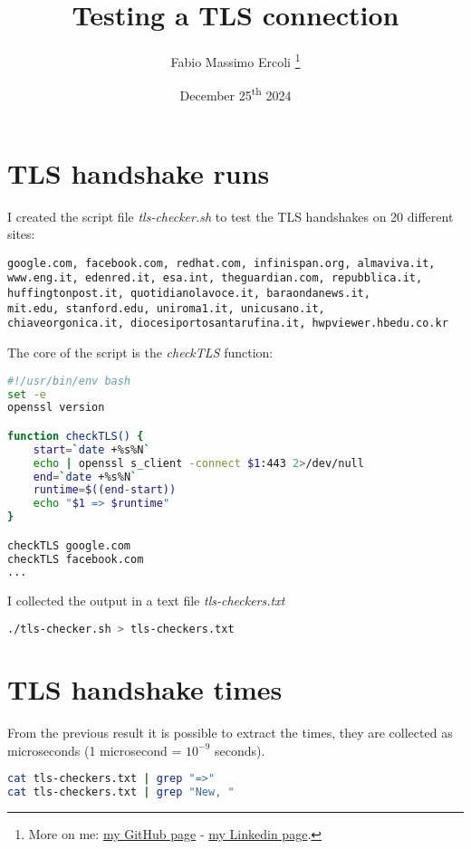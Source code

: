 \documentclass{article}
\title{Testing a TLS connection}
\author{Fabio Massimo Ercoli
	\footnote{
		More on me:
		\href{https://github.com/fax4ever}{my GitHub page} -
		\href{https://www.linkedin.com/in/fabioercoli}{my Linkedin page}.
}}
\date{December 25\textsuperscript{th} 2024}
\begin{document}
\maketitle
\thispagestyle{empty}
	
\section{TLS handshake runs}

I created the script file \emph{tls-checker.sh} to test the TLS handshakes
on 20 different sites:

\begin{verbatim}
google.com, facebook.com, redhat.com, infinispan.org, almaviva.it, 
www.eng.it, edenred.it, esa.int, theguardian.com, repubblica.it, 
huffingtonpost.it, quotidianolavoce.it, baraondanews.it, 
mit.edu, stanford.edu, uniroma1.it, unicusano.it, 
chiaveorgonica.it, diocesiportosantarufina.it, hwpviewer.hbedu.co.kr
\end{verbatim}

\noindent The core of the script is the \emph{checkTLS} function:

\begin{lstlisting}[language=bash]
#!/usr/bin/env bash
set -e
openssl version

function checkTLS() {
	start=`date +%s%N`
	echo | openssl s_client -connect $1:443 2>/dev/null
	end=`date +%s%N`
	runtime=$((end-start))
	echo "$1 => $runtime"
}

checkTLS google.com
checkTLS facebook.com
...
\end{lstlisting}

\noindent I collected the output in a text file \emph{tls-checkers.txt}
\begin{lstlisting}[language=bash]
./tls-checker.sh > tls-checkers.txt
\end{lstlisting}

\section{TLS handshake times}

From the previous result it is possible to extract the times, 
they are collected as microseconds (1 microsecond = $10^{-9}$ seconds).

\begin{lstlisting}[language=bash]
cat tls-checkers.txt | grep "=>"
cat tls-checkers.txt | grep "New, "
\end{lstlisting}
\end{document}
